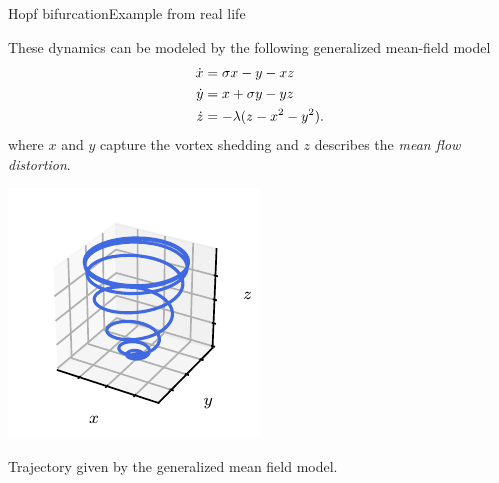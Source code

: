 \documentclass[usenames,dvipsnames,svgnames,10pt,aspectratio=169]{beamer}
\begin{document}
\begin{frame}[t, c]{Hopf bifurcation}{Example from real life}
	\begin{minipage}{.6\textwidth}
		These dynamics can be modeled by the following generalized mean-field model
			\begin{equation}
				\begin{aligned}
					\dot{x} & = \sigma x - y - xz \\
					\dot{y} & = x + \sigma y  - yz \\
					\dot{z} & = - \lambda( z - x^2 - y^2 ).
				\end{aligned}
				\notag
			\end{equation}
		where $x$ and $y$ capture the vortex shedding and $z$ describes the \emph{mean flow distortion}.
	\end{minipage}%
	\hfill
	\begin{minipage}{.28\textwidth}
		\centering
		\includegraphics[width=.95\textwidth]{generalized_mean_field_model}

		{\small Trajectory given by the generalized mean field model.}
	\end{minipage}

	\vspace{1cm}
\end{frame}
\end{document}
